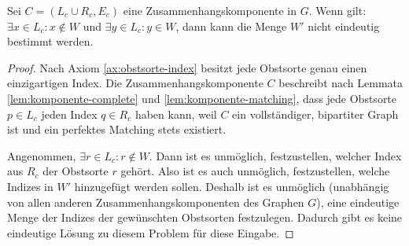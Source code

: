 \begin{lemma}\label{lem:komponente-one-not-wunschliste}
Sei $C = (L_c \cup R_c, E_c)$ eine Zusammenhangskomponente in $G$.
Wenn gilt: $\exists x \in L_c : x \notin W$ und $\exists y \in L_c : y \in W$,
dann kann die Menge $W'$ nicht eindeutig
bestimmt werden.
\end{lemma}
\begin{proof}
Nach Axiom \ref{ax:obstsorte-index} besitzt jede Obstsorte genau einen einzigartigen Index.
Die Zusammenhangskomponente $C$ beschreibt nach Lemmata \ref{lem:komponente-complete} und
\ref{lem:komponente-matching},
dass jede Obstsorte $p \in L_c$ jeden Index $q \in R_c$ haben kann, weil $C$ ein vollständiger, bipartiter Graph ist und ein perfektes Matching stets existiert.

Angenommen, $\exists r \in L_c : r \notin W$. Dann ist es unmöglich, festzustellen,
welcher Index aus $R_c$ der Obstsorte $r$ gehört.
Also ist es auch unmöglich, festzustellen, welche Indizes in $W'$ hinzugefügt werden sollen.
Deshalb
ist es unmöglich (unabhängig von allen anderen Zusammenhangskomponenten des Graphen $G$),
eine eindeutige Menge der Indizes der gewünschten Obstsorten festzulegen.
Dadurch gibt es keine eindeutige Lösung zu diesem Problem für diese Eingabe.
\end{proof}
